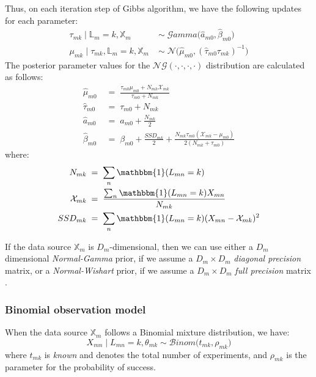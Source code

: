 Thus, on each iteration step of Gibbs algorithm, we have the following updates for each parameter:
\begin{equation}
  \begin{aligned}
  	\tau_{mk} \mid \mathbb{L}_{m}=k, \mathbb{X}_{m} \;& \sim \;\mathcal{G}amma\big(\hat{\mathit{a}}_{m0}, \hat{\beta}_{m0}\big) \\
	\mu_{mk} \mid \tau_{mk}, \mathbb{L}_{m}=k, \mathbb{X}_{m} \; & \sim \; \mathcal{N}\big(\hat{\mu}_{m0}, (\hat{\tau}_{m0} \tau_{mk})^{-1}\big)
  \end{aligned}
\end{equation}
The posterior parameter values for the $\mathcal{NG}(\cdot,\cdot,\cdot,\cdot)$ distribution are calculated as follows:
\begin{equation}
  \begin{aligned}
  	\hat{\mu}_{m0} \; &= \; \frac{\tau_{m0}\mu_{m0} + N_{mk}\mathcal{X}_{mk}}{\tau_{m0} + N_{mk}}\\
  	\hat{\tau}_{m0} \; &= \; \tau_{m0} + N_{mk}\\
  	\hat{\mathit{a}}_{m0} \; &= \; \mathit{a}_{m0} + \frac{N_{mk}}{2}\\
  	\hat{\beta}_{m0} \; &= \; \beta_{m0} + \frac{SSD_{mk}}{2} + \frac{N_{mk}\tau_{m0}(\mathcal{X}_{mk} - \mu_{m0})}{2(N_{mk}+\tau_{m0})}
  \end{aligned}
\end{equation}
where: 
\begin{equation}
  \begin{aligned}
		N_{mk} \; &= \; \sum_{n}\mathbbm{1}(L_{mn}=k)\\ 
		\mathcal{X}_{mk} \; &= \; \frac{\sum_{n}\mathbbm{1}(L_{mn}=k)X_{mn}}{N_{mk}} \\
		SSD_{mk} \; &= \; \sum_{n}\mathbbm{1}(L_{mn}=k)(X_{mn}-\mathcal{X}_{mk})^{2}
  \end{aligned}
\end{equation} 

If the data source $\mathbb{X}_{m}$ is $D_{m}$-dimensional, then we can use either a $D_{m}$ dimensional \emph{Normal-Gamma} prior, if we assume a $D_{m} \times D_{m}$ \emph{diagonal precision} matrix, or a \emph{Normal-Wishart} prior, if we assume a $D_{m} \times D_{m}$ \emph{full precision} matrix \cite[Ch. 2]{Bishop2006}.

\subsubsection*{Binomial observation model}
When the data source $\mathbb{X}_{m}$ follows a Binomial mixture distribution, we have:
\begin{equation}
	X_{mn} \mid L_{mn} = k, \theta_{mk} \sim \mathcal{B}inom\big(t_{mk}, \rho_{mk}\big)
\end{equation}
where $t_{mk}$ is \emph{known} and denotes the total number of experiments, and $\rho_{mk}$ is the parameter for the probability of success.


